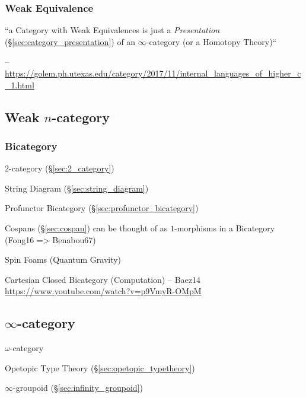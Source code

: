 \subsubsection{Weak Equivalence}\label{sec:weak_equivalence}

``a Category with Weak Equivalences is just a \emph{Presentation}
(\S\ref{sec:category_presentation}) of an $\infty$-category (or a Homotopy
Theory)``

--\url{https://golem.ph.utexas.edu/category/2017/11/internal_languages_of_higher_c_1.html}



\subsection{Weak $n$-category}\label{sec:weak_ncategory}

\subsubsection{Bicategory}\label{sec:bicategory}

$2$-category (\S\ref{sec:2_category})

String Diagram (\S\ref{sec:string_diagram})

Profunctor Bicategory (\S\ref{sec:profunctor_bicategory})

Cospans (\S\ref{sec:cospan}) can be thought of as $1$-morphisms in a
Bicategory (Fong16 => Benabou67)

Spin Foams (Quantum Gravity)

Cartesian Closed Bicategory (Computation) -- Baez14
\url{https://www.youtube.com/watch?v=p9VmyR-OMpM}



\subsection{$\infty$-category}\label{sec:infinity_category}

$\omega$-category

Opetopic Type Theory (\S\ref{sec:opetopic_typetheory})

\fist $\infty$-groupoid (\S\ref{sec:infinity_groupoid})



